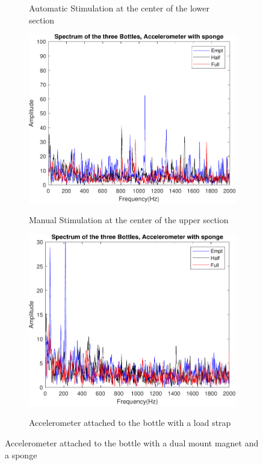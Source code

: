 \begin{figure}[]
\begin{subfigure}{0.45\textwidth}
        \caption{Automatic Stimulation at the center of the lower section}{}
        \label{subfig:ResAcEsAuBot}
    \end{subfigure}
    \begin{subfigure}{0.45\textwidth}
        \centering
        \includegraphics[width=\linewidth]{Chapters/6CHP/Figures/ResultsSensors/AcEsMaTop.pdf}
        \caption{Manual Stimulation at the center of the upper section}{}
        \label{subfig:ResAcEsMaTop}
    \end{subfigure}
    \begin{subfigure}{0.45\textwidth}
        \centering
        \includegraphics[width=\linewidth]{Chapters/6CHP/Figures/ResultsSensors/AcEsAuTop.pdf}
        \caption{Accelerometer attached to the bottle with a load strap}{}
        \label{subfig:ResAcEsAuTop}
    \end{subfigure}
    \caption{Accelerometer attached to the bottle with a dual mount magnet and a sponge}{}
    \label{fig:AccSponge}
\end{figure}

